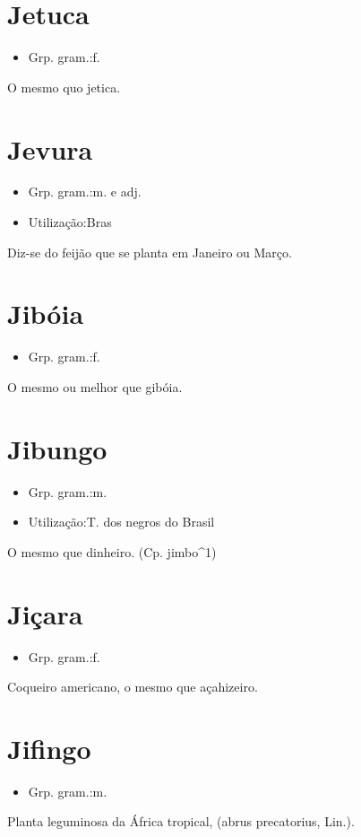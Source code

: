 \documentclass{article}
\begin{document}
\section{Jetuca}
\begin{itemize}
\item {Grp. gram.:f.}
\end{itemize}
O mesmo quo \textunderscore jetica\textunderscore .
\section{Jevura}
\begin{itemize}
\item {Grp. gram.:m.  e  adj.}
\end{itemize}
\begin{itemize}
\item {Utilização:Bras}
\end{itemize}
Diz-se do feijão que se planta em Janeiro ou Março.
\section{Jibóia}
\begin{itemize}
\item {Grp. gram.:f.}
\end{itemize}
O mesmo ou melhor que \textunderscore gibóia\textunderscore .
\section{Jibungo}
\begin{itemize}
\item {Grp. gram.:m.}
\end{itemize}
\begin{itemize}
\item {Utilização:T. dos negros do Brasil}
\end{itemize}
O mesmo que \textunderscore dinheiro\textunderscore .
(Cp. \textunderscore jimbo\textunderscore ^1)
\section{Jiçara}
\begin{itemize}
\item {Grp. gram.:f.}
\end{itemize}
Coqueiro americano, o mesmo que \textunderscore açahizeiro\textunderscore .
\section{Jifingo}
\begin{itemize}
\item {Grp. gram.:m.}
\end{itemize}
Planta leguminosa da África tropical, (\textunderscore abrus precatorius\textunderscore , Lin.).
\end{document}
